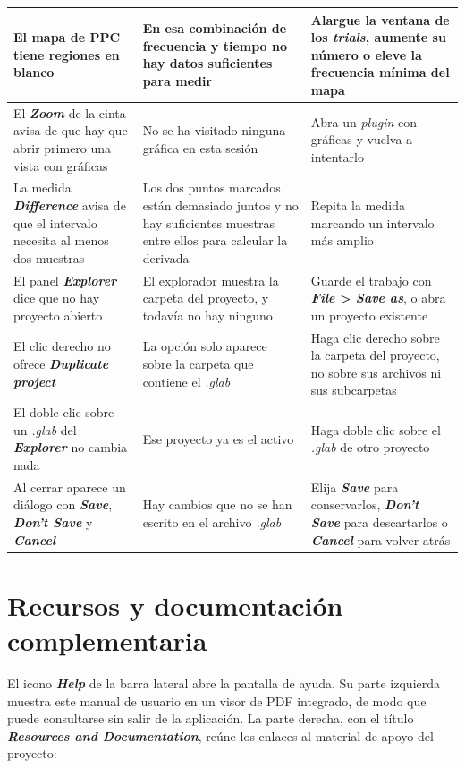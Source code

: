 \documentclass[11pt,a4paper]{article}
\begin{document}
\begin{center}
\begin{longtable}{|p{}|p{}|p{}|}
\hline
El mapa de \textbf{PPC} tiene regiones en blanco & En esa combinaci\'on de frecuencia y tiempo no hay datos suficientes para medir & Alargue la ventana de los \textit{trials}, aumente su n\'umero o eleve la frecuencia m\'inima del mapa \\
\hline
El \textbf{\textit{Zoom}} de la cinta avisa de que hay que abrir primero una vista con gr\'aficas & No se ha visitado ninguna gr\'afica en esta sesi\'on & Abra un \textit{plugin} con gr\'aficas y vuelva a intentarlo \\
\hline
La medida \textbf{\textit{Difference}} avisa de que el intervalo necesita al menos dos muestras & Los dos puntos marcados est\'an demasiado juntos y no hay suficientes muestras entre ellos para calcular la derivada & Repita la medida marcando un intervalo m\'as amplio \\
\hline
El panel \textbf{\textit{Explorer}} dice que no hay proyecto abierto & El explorador muestra la carpeta del proyecto, y todav\'ia no hay ninguno & Guarde el trabajo con \textbf{\textit{File} > \textit{Save as}}, o abra un proyecto existente \\
\hline
El clic derecho no ofrece \textbf{\textit{Duplicate project}} & La opci\'on solo aparece sobre la carpeta que contiene el \textit{.glab} & Haga clic derecho sobre la carpeta del proyecto, no sobre sus archivos ni sus subcarpetas \\
\hline
El doble clic sobre un \textit{.glab} del \textbf{\textit{Explorer}} no cambia nada & Ese proyecto ya es el activo & Haga doble clic sobre el \textit{.glab} de otro proyecto \\
\hline
Al cerrar aparece un di\'alogo con \textbf{\textit{Save}}, \textbf{\textit{Don't Save}} y \textbf{\textit{Cancel}} & Hay cambios que no se han escrito en el archivo \textit{.glab} & Elija \textbf{\textit{Save}} para conservarlos, \textbf{\textit{Don't Save}} para descartarlos o \textbf{\textit{Cancel}} para volver atr\'as \\
\hline
\end{longtable}
\end{center}

\clearpage

\section{Recursos y documentaci\'on complementaria}

El icono \textbf{\textit{Help}} de la barra lateral abre la pantalla de ayuda. Su parte izquierda muestra este manual de usuario en un visor de PDF integrado, de modo que puede consultarse sin salir de la aplicaci\'on. La parte derecha, con el t\'itulo \textbf{\textit{Resources and Documentation}}, re\'une los enlaces al material de apoyo del proyecto:
\end{document}
